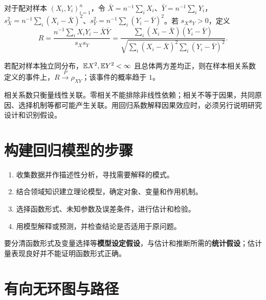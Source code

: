 \begin{definition}[样本相关系数]\label{reg:entry:5}
对于配对样本 $(X_i,Y_i)_{i=1}^n$，令 $\bar X=n^{-1}\sum_i X_i$、$\bar Y=n^{-1}\sum_iY_i$，$s_X^2=n^{-1}\sum_i(X_i-\bar X)^2$、$s_Y^2=n^{-1}\sum_i(Y_i-\bar Y)^2$。若 $s_Xs_Y>0$，定义
\[R=\frac{n^{-1}\sum_i X_iY_i-\bar X\bar Y}{s_Xs_Y}
=\frac{\sum_i(X_i-\bar X)(Y_i-\bar Y)}{\sqrt{\sum_i(X_i-\bar X)^2\sum_i(Y_i-\bar Y)^2}}.\]
\end{definition}

\begin{theorem}[样本相关系数的一致性]\label{reg:entry:6}
若配对样本独立同分布，$\mathbb{E} X^2,\mathbb{E} Y^2<\infty$ 且总体两方差均正，则在样本相关系数定义的事件上，$R\xrightarrow{P}\rho_{XY}$；该事件的概率趋于 $1$。
\end{theorem}

\begin{proposition}[相关性与因果关系]\label{reg:entry:7}
相关系数只衡量线性关联。零相关不能排除非线性依赖；相关不等于因果，共同原因、选择机制等都可能产生关联。用回归系数解释因果效应时，必须另行说明研究设计和识别假设。
\end{proposition}

\section{构建回归模型的步骤}

\begin{proposition}[四步建模及两类假设]\label{reg:entry:8}
\begin{enumerate}
\item 收集数据并作描述性分析，寻找需要解释的模式。
\item 结合领域知识建立理论模型，确定对象、变量和作用机制。
\item 选择函数形式、未知参数及误差条件，进行估计和检验。
\item 用模型解释或预测，并检查结论是否适用于原问题。
\end{enumerate}
要分清函数形式及变量选择等\textbf{模型设定假设}，与估计和推断所需的\textbf{统计假设}；估计量表现良好并不能证明函数形式正确。
\end{proposition}

\section{有向无环图与路径}

